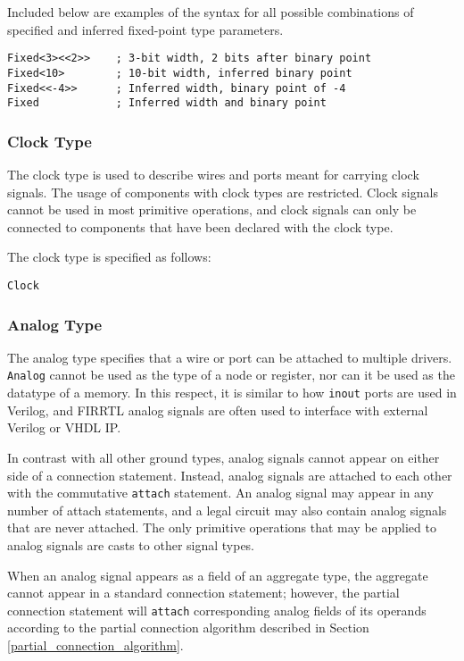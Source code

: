 \documentclass[12pt]{article}
\begin{document}
Included below are examples of the syntax for all possible combinations of specified and inferred
fixed-point type parameters.
\begin{lstlisting}
Fixed<3><<2>>    ; 3-bit width, 2 bits after binary point
Fixed<10>        ; 10-bit width, inferred binary point
Fixed<<-4>>      ; Inferred width, binary point of -4
Fixed            ; Inferred width and binary point
\end{lstlisting}

\subsubsection{Clock Type}

The clock type is used to describe wires and ports meant for carrying clock signals. The usage of components with clock types are restricted. Clock signals cannot be used in most primitive operations, and clock signals can only be connected to components that have been declared with the clock type.

The clock type is specified as follows:
\begin{lstlisting}
Clock
\end{lstlisting}

\subsubsection{Analog Type}

The analog type specifies that a wire or port can be attached to multiple drivers. \verb|Analog|
cannot be used as the type of a node or register, nor can it be used as the datatype of a memory. In
this respect, it is similar to how \verb|inout| ports are used in Verilog, and FIRRTL analog signals
are often used to interface with external Verilog or VHDL IP.

In contrast with all other ground types, analog signals cannot appear on either side of a connection
statement. Instead, analog signals are attached to each other with the commutative \verb|attach|
statement. An analog signal may appear in any number of attach statements, and a legal circuit may
also contain analog signals that are never attached. The only primitive operations that may be
applied to analog signals are casts to other signal types.

When an analog signal appears as a field of an aggregate type, the aggregate cannot appear in a
standard connection statement; however, the partial connection statement will \verb|attach|
corresponding analog fields of its operands according to the partial connection algorithm described
in Section \ref{partial_connection_algorithm}.
\end{document}
